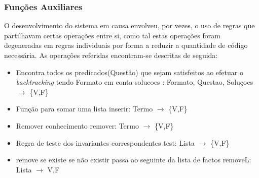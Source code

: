 \documentclass{article}
\begin{document}
\subsubsection{Funções Auxiliares}
O desenvolvimento do sistema em causa envolveu, por vezes, o uso de regras que partilhavam certas operações entre si, como tal estas operações foram degeneradas em regras individuais por forma a reduzir a quantidade de código necessária. As operações referidas encontram-se descritas de seguida:
\begin{itemize}
	\item Encontra todos os predicados(Questão) que sejam satisfeitos ao efetuar o \textit{backtracking} tendo Formato em conta
\newline
solucoes : Formato, Questao, Soluçoes $\to$ \{V,F\}
	\item Função para somar uma lista      
\newline
inserir: Termo $\to$ \{V,F\}
	\item Remover conhecimento
\newline
remover: Termo $\to$ \{V,F\}
	\item Regra de teste dos invariantes correspondentes
\newline
test: Lista $\to$ \{V,F\}
	\item remove se existe se não existir passa ao seguinte da lista de factos
\newline
removeL: Lista $\to$ {V,F}
\end{itemize}
\end{document}
